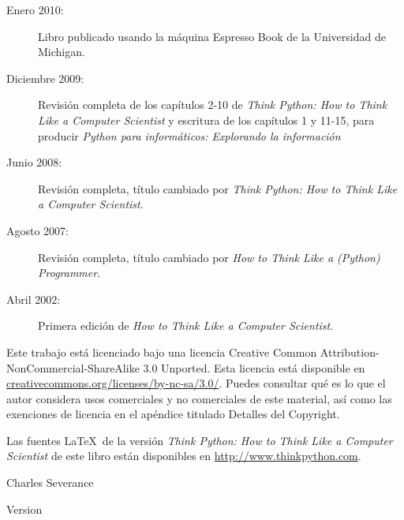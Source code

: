 \begin{latexonly}
{\begin{description}
\item[Enero 2010:] Libro publicado usando la máquina
Espresso Book de la Universidad de Michigan.

\item[Diciembre 2009:] Revisión completa de los capítulos 2-10 de
\emph{Think Python: How to Think Like
a Computer Scientist}
y escritura de los capítulos 1 y 11-15, para
producir 
\emph{Python para informáticos: Explorando la información}

\item[Junio 2008:] Revisión completa, título cambiado por
\emph{Think Python: How to Think Like
a Computer Scientist}.

\item[Agosto 2007:] Revisión completa, título cambiado por
\emph{How to Think Like a (Python) Programmer}.

\item[Abril 2002:] Primera edición de \emph{How to Think Like
a Computer Scientist}.

\end{description}

\vspace{0.2in}

Este trabajo está licenciado bajo una licencia
Creative Common
Attribution-NonCommercial-ShareAlike 3.0 Unported.
Esta licencia está
disponible en
\url{creativecommons.org/licenses/by-nc-sa/3.0/}. Puedes
consultar qué es lo que el autor considera usos comerciales y no comerciales
de este material, así como las exenciones de licencia
en el apéndice titulado Detalles del Copyright.

Las fuentes \LaTeX\ de la versión 
\emph{Think Python: How to Think Like
	a Computer Scientist}
de este libro están disponibles en
\url{http://www.thinkpython.com}.

\vspace{0.2in}

} %

\end{latexonly}



\begin{htmlonly}


{\Large \thetitle}

{\large 
Charles Severance}

Version \theversion

\setcounter{chapter}{-1}

\end{htmlonly}
